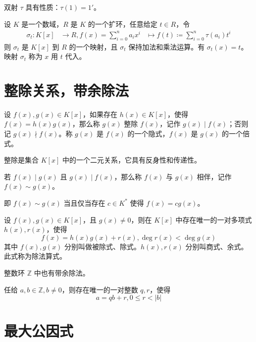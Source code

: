 双射 $\tau$ 具有性质：$\tau(1) = 1'$。

\begin{theorem}
	设 $K$ 是一个数域，$R$ 是 $K$ 的一个扩环，任意给定 $t\in R$，令
	\begin{equation*}
		\begin{aligned}
			\sigma_t : K[x] & \to R, f(x) = \sum_{i=0}^n a_ix^i & \mapsto f(t) \coloneqq  \sum_{i=0}^n \tau(a_i)t^i
		\end{aligned}
	\end{equation*}
	则 $\sigma_t$ 是 $K[x]$ 到 $R$ 的一个映射，且 $\sigma_t$ 保持加法和乘法运算。有 $\sigma_t(x) = t$。映射 $\sigma_t$ 称为 $x$ 用 $t$ 代入。
\end{theorem}

\section{整除关系，带余除法}

设 $f(x), g(x) \in K[x]$，如果存在 $h(x) \in K[x]$，使得 $f(x) = h(x)g(x)$，那么称 $g(x)$ 整除 $f(x)$，记作 $g(x) \mid f(x)$；否则记 $g(x) \nmid f(x)$。称 $g(x)$ 是 $f(x)$ 的一个隐式，$f(x)$ 是 $g(x)$ 的一个倍式。

整除是集合 $K[x]$ 中的一个二元关系，它具有反身性和传递性。

\begin{definition}
	若 $f(x) \mid g(x)$ 且 $g(x) \mid f(x)$，那么称 $f(x)$ 与 $g(x)$ 相伴，记作 $f(x) \sim g(x)$。
\end{definition}

即 $f(x) \sim g(x)$ 当且仅当存在 $c \in K^*$ 使得 $f(x) = cg(x)$。

\begin{definition}[带余除法]
	设 $f(x), g(x) \in K[x]$，且 $g(x) \ne 0$，则在 $K[x]$ 中存在唯一的一对多项式 $h(x), r(x)$，使得
	\[f(x) = h(x)g(x) + r(x), \deg r(x) < \deg g(x)\]
	其中 $f(x), g(x)$ 分别叫做被除式、除式。$h(x),r(x)$ 分别叫商式、余式。此式称为除法算式。
\end{definition}

整数环 $\mathbb{Z}$ 中也有带余除法。

\begin{theorem}
	任给 $a,b\in \mathbb{Z}, b\ne 0$，则存在唯一的一对整数 $q,r$，使得
	\[a = qb + r, 0 \leqslant r < |b|\]
\end{theorem}

\section{最大公因式}

